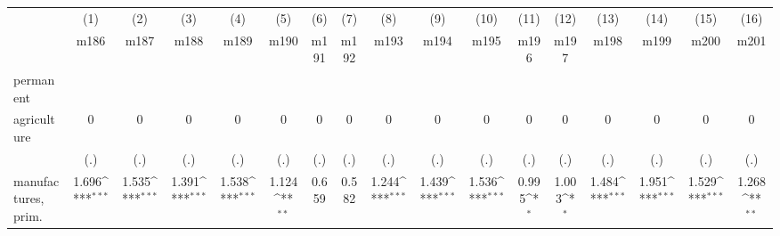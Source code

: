 {
\def\sym#1{\ifmmode^{#1}\else\(^{#1}\)\fi}
\begin{tabular}{l*{16}{c}}
\hline\hline
                    &\multicolumn{1}{c}{(1)}&\multicolumn{1}{c}{(2)}&\multicolumn{1}{c}{(3)}&\multicolumn{1}{c}{(4)}&\multicolumn{1}{c}{(5)}&\multicolumn{1}{c}{(6)}&\multicolumn{1}{c}{(7)}&\multicolumn{1}{c}{(8)}&\multicolumn{1}{c}{(9)}&\multicolumn{1}{c}{(10)}&\multicolumn{1}{c}{(11)}&\multicolumn{1}{c}{(12)}&\multicolumn{1}{c}{(13)}&\multicolumn{1}{c}{(14)}&\multicolumn{1}{c}{(15)}&\multicolumn{1}{c}{(16)}\\
                    &\multicolumn{1}{c}{m186}&\multicolumn{1}{c}{m187}&\multicolumn{1}{c}{m188}&\multicolumn{1}{c}{m189}&\multicolumn{1}{c}{m190}&\multicolumn{1}{c}{m191}&\multicolumn{1}{c}{m192}&\multicolumn{1}{c}{m193}&\multicolumn{1}{c}{m194}&\multicolumn{1}{c}{m195}&\multicolumn{1}{c}{m196}&\multicolumn{1}{c}{m197}&\multicolumn{1}{c}{m198}&\multicolumn{1}{c}{m199}&\multicolumn{1}{c}{m200}&\multicolumn{1}{c}{m201}\\
\hline
permanent           &                     &                     &                     &                     &                     &                     &                     &                     &                     &                     &                     &                     &                     &                     &                     &                     \\
agriculture         &           0         &           0         &           0         &           0         &           0         &           0         &           0         &           0         &           0         &           0         &           0         &           0         &           0         &           0         &           0         &           0         \\
                    &         (.)         &         (.)         &         (.)         &         (.)         &         (.)         &         (.)         &         (.)         &         (.)         &         (.)         &         (.)         &         (.)         &         (.)         &         (.)         &         (.)         &         (.)         &         (.)         \\
[1em]
manufactures, prim. &       1.696\sym{***}&       1.535\sym{***}&       1.391\sym{***}&       1.538\sym{***}&       1.124\sym{**} &       0.659         &       0.582         &       1.244\sym{***}&       1.439\sym{***}&       1.536\sym{***}&       0.995\sym{*}  &       1.003\sym{*}  &       1.484\sym{***}&       1.951\sym{***}&       1.529\sym{***}&       1.268\sym{**} \\

\end{tabular}}
